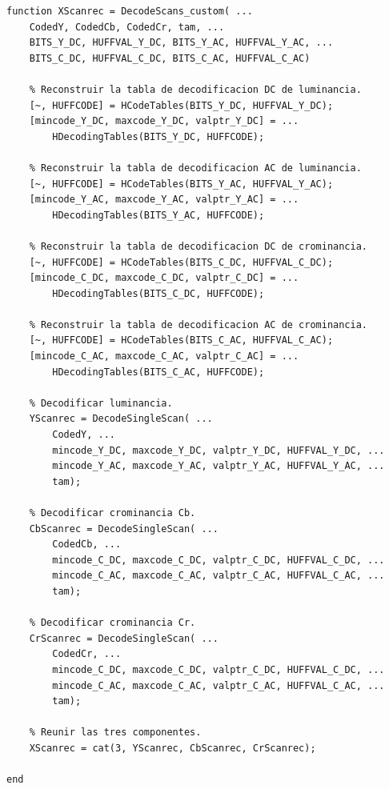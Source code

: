 \documentclass[11pt,a4paper,oneside]{report}
\begin{document}
\begin{lstlisting}
function XScanrec = DecodeScans_custom( ...
    CodedY, CodedCb, CodedCr, tam, ...
    BITS_Y_DC, HUFFVAL_Y_DC, BITS_Y_AC, HUFFVAL_Y_AC, ...
    BITS_C_DC, HUFFVAL_C_DC, BITS_C_AC, HUFFVAL_C_AC)

    % Reconstruir la tabla de decodificacion DC de luminancia.
    [~, HUFFCODE] = HCodeTables(BITS_Y_DC, HUFFVAL_Y_DC);
    [mincode_Y_DC, maxcode_Y_DC, valptr_Y_DC] = ...
        HDecodingTables(BITS_Y_DC, HUFFCODE);

    % Reconstruir la tabla de decodificacion AC de luminancia.
    [~, HUFFCODE] = HCodeTables(BITS_Y_AC, HUFFVAL_Y_AC);
    [mincode_Y_AC, maxcode_Y_AC, valptr_Y_AC] = ...
        HDecodingTables(BITS_Y_AC, HUFFCODE);

    % Reconstruir la tabla de decodificacion DC de crominancia.
    [~, HUFFCODE] = HCodeTables(BITS_C_DC, HUFFVAL_C_DC);
    [mincode_C_DC, maxcode_C_DC, valptr_C_DC] = ...
        HDecodingTables(BITS_C_DC, HUFFCODE);

    % Reconstruir la tabla de decodificacion AC de crominancia.
    [~, HUFFCODE] = HCodeTables(BITS_C_AC, HUFFVAL_C_AC);
    [mincode_C_AC, maxcode_C_AC, valptr_C_AC] = ...
        HDecodingTables(BITS_C_AC, HUFFCODE);

    % Decodificar luminancia.
    YScanrec = DecodeSingleScan( ...
        CodedY, ...
        mincode_Y_DC, maxcode_Y_DC, valptr_Y_DC, HUFFVAL_Y_DC, ...
        mincode_Y_AC, maxcode_Y_AC, valptr_Y_AC, HUFFVAL_Y_AC, ...
        tam);

    % Decodificar crominancia Cb.
    CbScanrec = DecodeSingleScan( ...
        CodedCb, ...
        mincode_C_DC, maxcode_C_DC, valptr_C_DC, HUFFVAL_C_DC, ...
        mincode_C_AC, maxcode_C_AC, valptr_C_AC, HUFFVAL_C_AC, ...
        tam);

    % Decodificar crominancia Cr.
    CrScanrec = DecodeSingleScan( ...
        CodedCr, ...
        mincode_C_DC, maxcode_C_DC, valptr_C_DC, HUFFVAL_C_DC, ...
        mincode_C_AC, maxcode_C_AC, valptr_C_AC, HUFFVAL_C_AC, ...
        tam);

    % Reunir las tres componentes.
    XScanrec = cat(3, YScanrec, CbScanrec, CrScanrec);

end
\end{lstlisting}
\end{document}
